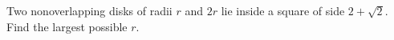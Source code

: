 Two nonoverlapping disks of radii $r$ and $2r$ lie inside a square of side $2+\sqrt2$. Find the largest possible $r$.
